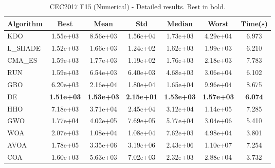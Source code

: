 \begin{table}[H]
\centering\small
\caption{CEC2017 F15 (Numerical) - Detailed results. Best in bold.}
\label{tab:cec2017_F15}
\begin{tabular}{lcccccc}
\toprule
\textbf{Algorithm} & \textbf{Best} & \textbf{Mean} & \textbf{Std} & \textbf{Median} & \textbf{Worst} & \textbf{Time(s)} \\
\midrule
KDO & 1.55e+03 & 8.56e+03 & 1.56e+04 & 1.73e+03 & 4.29e+04 & 6.973 \\
L_SHADE & 1.52e+03 & 1.66e+03 & 1.24e+02 & 1.62e+03 & 1.99e+03 & 6.210 \\
CMA_ES & 1.59e+03 & 1.77e+03 & 1.19e+02 & 1.76e+03 & 2.18e+03 & 7.783 \\
RUN & 1.59e+03 & 6.54e+03 & 6.40e+03 & 4.68e+03 & 3.06e+04 & 6.102 \\
GBO & 6.20e+03 & 2.16e+04 & 1.80e+04 & 1.65e+04 & 9.96e+04 & 8.675 \\
DE & \textbf{1.51e+03} & \textbf{1.53e+03} & \textbf{2.15e+01} & \textbf{1.53e+03} & \textbf{1.57e+03} & \textbf{6.074} \\
HHO & 7.18e+03 & 3.71e+04 & 2.45e+04 & 3.12e+04 & 1.14e+05 & 7.285 \\
GWO & 1.77e+04 & 4.02e+05 & 7.69e+05 & 5.77e+04 & 3.04e+06 & 5.410 \\
WOA & 2.07e+03 & 1.08e+04 & 1.08e+04 & 7.62e+03 & 4.98e+04 & 3.801 \\
AVOA & 1.78e+05 & 3.35e+06 & 3.19e+06 & 2.43e+06 & 1.10e+07 & 7.254 \\
COA & 1.60e+03 & 5.63e+03 & 7.02e+03 & 2.32e+03 & 2.88e+04 & 3.732 \\
\bottomrule
\end{tabular}
\end{table}
